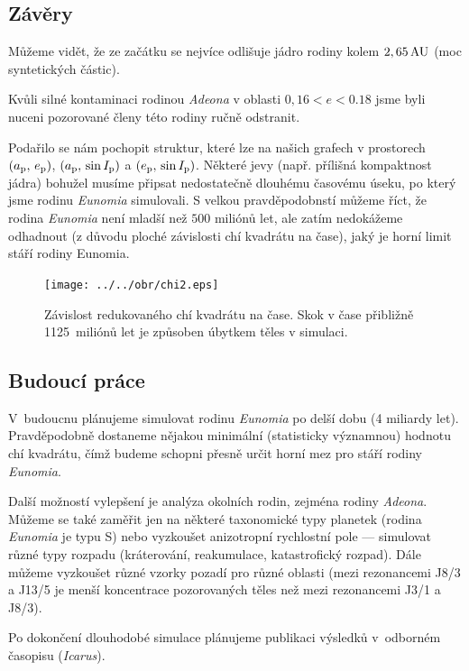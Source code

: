 \documentclass[a4paper, 12pt]{article}
\begin{document}
\subsection{Závěry}

Můžeme vidět, že ze začátku se nejvíce odlišuje jádro rodiny kolem $2,65\,{\rm AU}$ (moc syntetických částic).   

Kvůli silné kontaminaci rodinou \textit{Adeona} v oblasti $0,16<e<0.18$ jsme byli nuceni pozorované členy této rodiny ručně odstranit.

Podařilo se nám pochopit struktur, které lze na našich grafech v prostorech $(a_{\rm p},\,e_{\rm p})$, $(a_{\rm p},\,\sin I_{\rm p})$ a  $(e_{\rm p},\,\sin I_{\rm p})$. Některé jevy (např. přílišná kompaktnost jádra) bohužel musíme připsat nedostatečně dlouhému časovému úseku, po který jsme rodinu \textit{Eunomia} simulovali. S velkou pravděpodobnstí můžeme říct, že rodina \textit{Eunomia} není mladší než $500$ miliónů let, ale zatím nedokážeme odhadnout (z důvodu ploché závislosti chí kvadrátu na čase), jaký je horní limit stáří rodiny Eunomia.


	\begin{figure}
		\centering
		\texttt{[image: ../../obr/chi2.eps]}
		\caption{Závislost redukovaného chí kvadrátu na čase. Skok v čase přibližně 1125~miliónů let je způsoben úbytkem těles v simulaci.}
	\end{figure}


\subsection{Budoucí práce}

V~budoucnu plánujeme simulovat rodinu \textit{Eunomia} po delší dobu (4 miliardy let). Pravděpodobně dostaneme nějakou minimální (statisticky významnou) hodnotu chí kvadrátu, čímž budeme schopni přesně určit horní mez pro stáří rodiny \textit{Eunomia}.   

Další možností vylepšení je analýza okolních rodin, zejména rodiny \textit{Adeona}. %
Můžeme se také zaměřit jen na některé taxonomické typy planetek (rodina \textit{Eunomia} je typu S) nebo vyzkoušet anizotropní rychlostní pole --- simulovat různé typy rozpadu (kráterování, reakumulace, katastrofický rozpad). Dále můžeme vyzkoušet různé vzorky pozadí pro různé oblasti (mezi rezonancemi J8/3 a J13/5 je menší koncentrace pozorovaných těles než mezi rezonancemi J3/1 a J8/3).

Po dokončení dlouhodobé simulace plánujeme publikaci výsledků v~odborném časopisu (\textit{Icarus}).


% 
\end{document}
